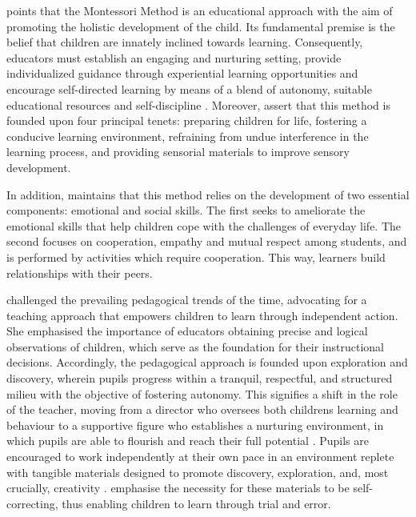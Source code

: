 \textcite{lillard2013playful} points that the Montessori Method is an educational
approach with the aim of promoting the holistic development of the
child. Its fundamental premise is the belief that children are innately
inclined towards learning. Consequently, educators must establish an
engaging and nurturing setting, provide individualized guidance through
experiential learning opportunities and encourage self-directed learning
by means of a blend of autonomy, suitable educational resources and
self-discipline \cite{marshall2017montessori}. Moreover, \textcite{pla2007}
assert that this method is founded upon four principal tenets: preparing
children for life, fostering a conducive learning environment,
refraining from undue interference in the learning process, and
providing sensorial materials to improve sensory development.

In addition, \textcite{marshall2017montessori} maintains that this method relies on the
development of two essential components: emotional and social skills.
The first seeks to ameliorate the emotional skills that help children
cope with the challenges of everyday life. The second focuses on
cooperation, empathy and mutual respect among students, and is performed
by activities which require cooperation. This way, learners build
relationships with their peers.

\textcite{montessori1937metodo} challenged the prevailing pedagogical trends of the
time, advocating for a teaching approach that empowers children to learn
through independent action. She emphasised the importance of educators
obtaining precise and logical observations of children, which serve as
the foundation for their instructional decisions. Accordingly, the
pedagogical approach is founded upon exploration and discovery, wherein
pupils progress within a tranquil, respectful, and structured milieu
with the objective of fostering autonomy. This signifies a shift in the
role of the teacher, moving from a director who oversees both
children\textquotesingle s learning and behaviour \cite{denervaud2019} to a supportive figure who establishes a
nurturing environment, in which pupils are able to flourish and reach
their full potential \cite{marshall2017montessori}. Pupils are encouraged to work
independently at their own pace in an environment replete with tangible
materials designed to promote discovery, exploration, and, most
crucially, creativity \cite{marshall2017montessori}. \textcite{denervaud2019} emphasise the necessity for these materials to be
self-correcting, thus enabling children to learn through trial and
error.

